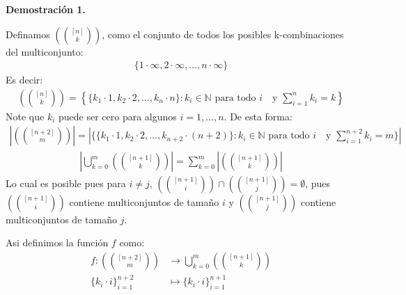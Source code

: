\begin{solucion}
    \textbf{Demostración 1.}

    Definamos $\left(\binom{[n]}{k}\right)$, como el conjunto de todos los posibles k-combinaciones del multiconjunto:
    \begin{align*}
        \{
            1\cdot\infty, 2\cdot\infty, \ldots, n\cdot\infty
        \}
    \end{align*}
    Es decir:
    \begin{align*}
        \left(\binom{[n]}{k}\right) = \left\{
            \{k_1\cdot 1, k_2\cdot 2, \ldots, k_n\cdot n\}:k_i \in \mathbb N \text{ para todo $i$ } \text{ y } \sum_{i=1}^n k_i = k
        \right\}
    \end{align*}
    Note que $k_i$ puede ser cero para algunos $i = 1, \ldots, n$. De esta forma:
    \begin{align*}
        \left|\left(\binom{[n+2]}{m}\right)\right|= \left|
            \{
                \{k_1\cdot 1, k_2\cdot 2, \ldots, k_{n+2}\cdot (n+2)\}:k_i \in \mathbb N \text{ para todo $i$ } \text{ y } \sum_{i=1}^{n+2} k_i = m
            \}
        \right|
    \end{align*}
    \begin{align*}
        \left|
           \bigcup_{k=0}^m \left(\binom{[n+1]}{k}\right)
        \right| = \sum_{k=0}^m \left|\left(\binom{[n+1]}{k}\right)\right|
    \end{align*}
    Lo cual es posible pues para $i\neq j$, $\left(\binom{[n+1]}{i}\right)\cap\left(\binom{[n+1]}{j}\right)=\emptyset$, pues $\left(\binom{[n+1]}{i}\right)$ contiene multiconjuntos de tamaño $i$ y $\left(\binom{[n+1]}{j}\right)$ contiene multiconjuntos de tamaño $j$.

Asi definimos la función $f$ como:
\begin{align*}
    f:\left(\binom{[n+2]}{m}\right) &\to \bigcup_{k=0}^m \left(\binom{[n+1]}{k}\right)\\
    \{k_i\cdot i\}_{i=1}^{n+2} &\mapsto \{k_i\cdot i\}_{i=1}^{n+1} 
\end{align*}


\end{solucion}
